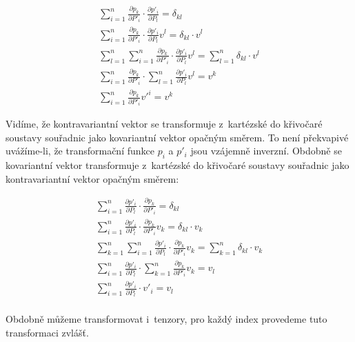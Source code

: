 \begin{equation}
\label{eq:transformace_kontravariantniho_vektoru_z_kartezske_soustavy}
\begin{split}
\sum_{i=1}^n \frac{\partial p_k}{\partial P'_i} \cdot \frac{\partial p'_i}{\partial P_l} = \delta_{kl} \\
\sum_{i=1}^n \frac{\partial p_k}{\partial P'_i} \cdot \frac{\partial p'_i}{\partial P_l} v^l = \delta_{kl} \cdot v^l \\
\sum_{l=1}^n \sum_{i=1}^n \frac{\partial p_k}{\partial P'_i} \cdot \frac{\partial p'_i}{\partial P_l} v^l = \sum_{l=1}^n \delta_{kl} \cdot v^l \\
\sum_{i=1}^n \frac{\partial p_k}{\partial P'_i} \cdot \sum_{l=1}^n \frac{\partial p'_i}{\partial P_l} v^l = v^k \\
\sum_{i=1}^n \frac{\partial p_k}{\partial P'_i} v'^i = v^k
\end{split}
\end{equation}

Vidíme, že kontravariantní vektor se transformuje z~kartézské do křivočaré soustavy souřadnic jako kovariantní vektor opačným směrem. To není překvapivé uvážíme-li, že transformační funkce \(p_i\) a \(p'_i\) jsou vzájemně inverzní. Obdobně se kovariantní vektor transformuje z~kartézské do křivočaré soustavy souřadnic jako kontravariantní vektor opačným směrem:

\begin{equation}
\label{eq:transformace_kovariantniho_vektoru_z_kartezske_soustavy}
\begin{split}
\sum_{i=1}^n \frac{\partial p'_i}{\partial P_l} \cdot \frac{\partial p_k}{\partial P'_i} = \delta_{kl} \\
\sum_{i=1}^n \frac{\partial p'_i}{\partial P_l} \cdot \frac{\partial p_k}{\partial P'_i} v_k = \delta_{kl} \cdot v_k \\
\sum_{k=1}^n \sum_{i=1}^n \frac{\partial p'_i}{\partial P_l} \cdot \frac{\partial p_k}{\partial P'_i} v_k = \sum_{k=1}^n \delta_{kl} \cdot v_k \\
\sum_{i=1}^n \frac{\partial p'_i}{\partial P_l} \cdot \sum_{k=1}^n \frac{\partial p_k}{\partial P'_i} v_k = v_l \\
\sum_{i=1}^n \frac{\partial p'_i}{\partial P_l} \cdot v'_i = v_l \\
\end{split}
\end{equation}

Obdobně můžeme transformovat i~tenzory, pro každý index provedeme tuto transformaci zvlášť.

